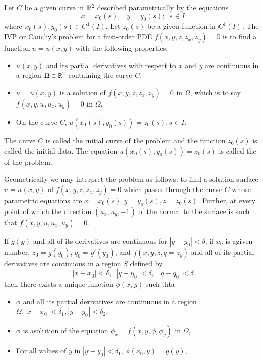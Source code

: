 \documentclass[12pt, a4paper, oneside, openright, titlepage]{book}
\begin{document}
\begin{cons}
    Let $C$ be a given curve in $\mathbb R^2$ described parametrically by the equations $$x=x_0(s),\;\;\;y=y_0(s);\;\;s \in I$$ where $x_0(s),y_0(s) \in C^1(I)$. Let $z_0(s)$ be a given function in $C^1(I)$. The IVP or Cauchy's problem for a first-order PDE $f(x,y,z,z_x,z_y) = 0$ is to find a function $u = u(x,y)$ with the following properties:\begin{itemize}
        \item $u(x,y)$ and its partial derivatives with respect to $x$ and $y$ are continuous in a region $\Omega \subset \mathbb R^2$ containing the curve $C$.
        \item $u = u(x,y)$ is a solution of $f(x,y,z,z_x,z_y) = 0$ in $\Omega$, which is to say $f(x,y,u,u_x,u_y) = 0$ in $\Omega$.
        \item On the curve $C$, $u(x_0(s),y_0(s)) = z_0(s), s \in I$.
    \end{itemize}
    The curve $C$ is called the initial curve of the problem and the function $z_0(s)$ is called the initial data. The equation $u(x_0(s),y_0(s)) = z_0(s)$ is called the  of the problem.
\end{cons}

Geometrically we may interpret the problem as follows: to find a solution surface $u = u(x,y)$ of $f(x,y,z,z_x,z_y) = 0$ which passes through the curve $C$ whose parametric equations are $x=x_0(s),y=y_0(s),z=z_0(s)$. Further, at every point of which the direction $(u_x,u_y,-1)$ of the normal to the surface is such that $f(x,y,u,u_x,u_y) = 0$.

\begin{thm}[Kowalewski]
    If $g(y)$ and all of its derivatives are continuous for $|y-y_0| < \delta$, if $x_0$ is agiven number, $z_0 = g(y_0)$, $q_0 = g'(y_0)$, and $f(x,y,z,q = z_y)$ and all of its partial derivatives are continuous in a region $S$ defined by \begin{equation*}
        |x-x_0| < \delta, \;\;|y-y_0| < \delta,\;\;|q-q_0| < \delta
    \end{equation*}
    then there exists a unique function $\phi(x,y)$ such thta \begin{itemize}
        \item $\phi$ and all its partial derivatives are continuous in a region $\Omega:|x-x_0| < \delta_1,|y-y_0|<\delta_2$,
        \item $\phi$ is asolution of the equation $\phi_x = f(x,y,\phi,\phi_y)$ in $\Omega$,
        \item For all values of $y$ in $|y-y_0| < \delta_1$, $\phi(x_0,y) = g(y)$,
    \end{itemize}
\end{thm}
\end{document}
